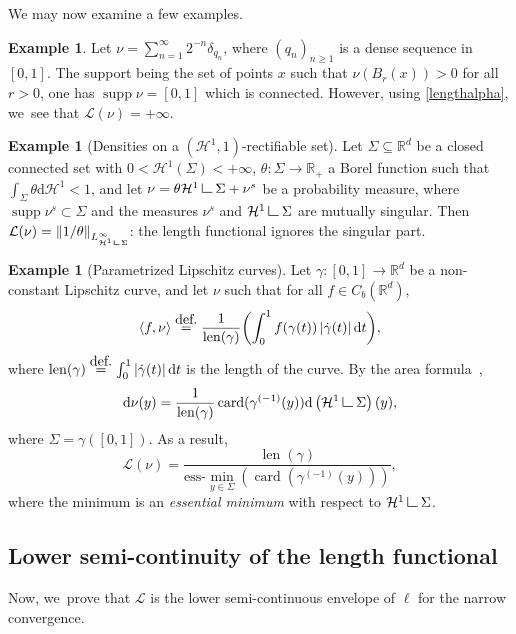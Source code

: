\documentclass[11pt]{article}
\numberwithin{equation}{section}
\theoremstyle{definition}
\newtheorem{example}[theorem]{Example}
\newcommand{\eqdef}{\ensuremath{\stackrel{\mbox{\upshape\tiny def.}}{=}}}
\newcommand{\norm}[1]{\left\lVert#1\right\rVert}
\newcommand\LM[1]{\hbox{\vrule width.5pt \vbox to#1pt{\vfill \hrule width#1pt height.5pt}}}
\newcommand\LL{{\mathchoice {\>\LM7\>}{\>\LM7\>}{\,\LM5\,}{\,\LM{3.35}\,}}}
\newcommand{\mres}{\LL}
\newcommand\cH{\mathcal{H}}
\newcommand{\RR}{\mathbb{R}}
\DeclareMathOperator{\supp}{supp}
\DeclareMathOperator{\len}{len}
\DeclareMathOperator{\card}{card}
\newcommand\dd{\mathrm{d}}
\newcommand{\abs}[1]{\left\lvert#1\right\rvert}
\newcommand{\ci}[2]{ \left[ #1, #2 \right] }
\begin{document}
We may now examine a few examples.
\begin{example}\label{example.diracs_dense_sequence}
Let $\nu=\sum_{n=1}^{\infty} 2^{-n}\delta_{q_n}$, where $(q_{n})_{n\ge 1}$ is a dense sequence in $\ci{0}{1}$. The support being the set of points $x$ such that $\nu(B_r(x)) > 0$ for all $r>0$, one has $\supp \nu = [0,1]$ which is connected. However, using \eqref{lengthalpha}, we~see that $\mathcal{L}(\nu)=+\infty$.
\end{example}

\begin{example}[Densities on a $(\cH^1,1)$-rectifiable set]\label{example.densities_rectifiable_set}
Let $\Sigma \subseteq \RR^d$ be a closed connected set with $0<\cH^1(\Sigma)<+\infty$, $\theta\colon \Sigma \rightarrow \RR_+$ a Borel function such that $ \int_\Sigma \theta\dd \cH^1 < 1$, and let $\nu = \theta \cH^1\mres \Sigma + \nu^s$ be a probability measure, where $\supp \nu^s \subset \Sigma$ and the measures $\nu^s$ and $\cH^1\mres\Sigma$ are mutually singular.
Then $\mathcal{L}(\nu)= \norm{1/\theta}_{L^\infty_{\cH^1\mres \Sigma}}$: the length functional ignores the singular part.
\end{example}

\begin{example}[Parametrized Lipschitz curves]\label{example.parametrized_curve}
Let $\gamma\colon \ci{0}{1}\rightarrow \RR^d$ be a non-constant Lipschitz curve, and let $\nu$ such that for all $f \in C_b(\RR^d)$,
\[
\langle f, \nu\rangle \eqdef \frac{1}{\len(\gamma)}\biggl(\int_0^1f(\gamma(t))\abs{\dot\gamma(t)}\dd t\biggr),
\]
where $\len(\gamma)\eqdef \int_0^1 \abs{\dot\gamma(t)}\dd t$ is the length of the curve.
By the area formula~\cite[Th.\,3.2.5]{federer2014geometric},
\begin{equation*}
\dd\nu(y)= \frac{1}{\len(\gamma)} \card(\gamma^{(-1)}(y))\dd\left( \cH^1\mres \Sigma\right)(y),
\end{equation*}
where $\Sigma=\gamma(\ci{0}{1})$. As a result,
\begin{equation}
\mathcal{L}(\nu) = \frac{\len(\gamma)}{\mathrm{ess}\mbox{-}\min_{y \in\Sigma}\left(\card(\gamma^{(-1)}(y))\right)},
\end{equation}
where the minimum is an \emph{essential minimum} with respect to $\cH^1\mres \Sigma$.
\end{example}

\subsection{Lower semi-continuity of the length functional}
\label{sec.length_functional_is_lsc}
Now, we~prove that $\mathcal{L}$ is the lower semi-continuous envelope of $\ell$ for the narrow convergence.
\end{document}
